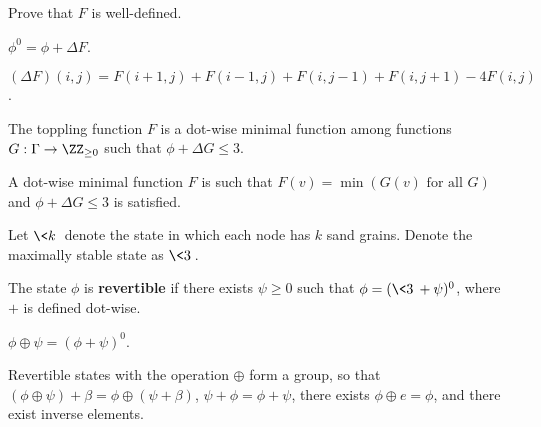 \documentclass[11pt]{scrartcl}
\begin{document}
  \begin{exercise}

    Prove that $F$ is well-defined.

  \end{exercise}

  \begin{exercise}

    $\phi^{0} = \phi + \Delta F$.

  \end{exercise}

  \begin{definition}
    $(\Delta F)(i, j) = F(i+1, j) + F(i-1, j) + F(i, j-1) + F(i,
    j+1) - 4 F(i, j)$.
  \end{definition}

  \begin{exercise}

    The toppling function $F$ is a dot-wise minimal function among
    functions $G: \Gamma \to \ZZ_{\geq 0}$ such that
    $\phi + \Delta G \leq 3$.

  \end{exercise}

  \begin{note*}
    A dot-wise minimal function $F$ is such that
    $F(v) = \min(G(v) \text{ for all $G$})$ and
    $\phi + \Delta G \leq 3$ is satisfied.
  \end{note*}

  \begin{definition}
    Let $\<k\>$ denote the state in which each node has $k$ sand grains.
    Denote the maximally stable state as $\< 3\>$.
  \end{definition}

  \begin{definition}
    The state $\phi$ is \textbf{revertible} if there exists $\psi \geq 0$ such
    that $\phi = (\< 3 \> + \psi)^{0}$, where $+$ is defined dot-wise.
  \end{definition}

  \begin{definition}
    $\phi \oplus \psi = (\phi + \psi)^{0}$.
  \end{definition}
  \begin{theorem}
    Revertible states with the operation $\oplus$ form a group, so
    that $(\phi \oplus \psi) + \beta = \phi \oplus (\psi + \beta)$,
    $\psi + \phi = \phi + \psi$, there exists $\phi \oplus e = \phi$,
    and there exist inverse elements.
  \end{theorem}
\end{document}
